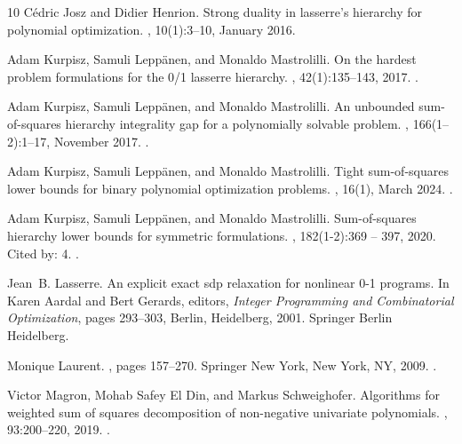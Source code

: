 \documentclass[11pt]{article}
\newcommand{\1}{\textbf{1}}
\begin{document}
\begin{thebibliography}{10}
C{\'e}dric Josz and Didier Henrion.
\newblock Strong duality in lasserre's hierarchy for polynomial optimization.
, 10(1):3--10, January 2016.

Adam Kurpisz, Samuli Lepp{\"{a}}nen, and Monaldo Mastrolilli.
\newblock On the hardest problem formulations for the 0/1 lasserre hierarchy.
, 42(1):135--143, 2017.
\newblock \href {https://doi.org/10.1287/MOOR.2016.0797} {}.

Adam Kurpisz, Samuli Lepp\"{a}nen, and Monaldo Mastrolilli.
\newblock An unbounded sum-of-squares hierarchy integrality gap for a polynomially solvable problem.
, 166(1–2):1–17, November 2017.
\newblock \href {https://doi.org/10.1007/s10107-016-1102-7} {}.

Adam Kurpisz, Samuli Lepp\"{a}nen, and Monaldo Mastrolilli.
\newblock Tight sum-of-squares lower bounds for binary polynomial optimization problems.
, 16(1), March 2024.
\newblock \href {https://doi.org/10.1145/3626106} {}.

Adam Kurpisz, Samuli Leppänen, and Monaldo Mastrolilli.
\newblock Sum-of-squares hierarchy lower bounds for symmetric formulations.
, 182(1-2):369 – 397, 2020.
\newblock Cited by: 4.
\newblock \href {https://doi.org/10.1007/s10107-019-01398-9} {}.

Jean~B. Lasserre.
\newblock An explicit exact sdp relaxation for nonlinear 0-1 programs.
\newblock In Karen Aardal and Bert Gerards, editors, {\em Integer Programming and Combinatorial Optimization}, pages 293--303, Berlin, Heidelberg, 2001. Springer Berlin Heidelberg.

Monique Laurent.
, pages 157--270.
\newblock Springer New York, New York, NY, 2009.
\newblock \href {https://doi.org/10.1007/978-0-387-09686-5_7} {}.

Victor Magron, Mohab {Safey El Din}, and Markus Schweighofer.
\newblock Algorithms for weighted sum of squares decomposition of non-negative univariate polynomials.
, 93:200--220, 2019.
\newblock \href {https://doi.org/10.1016/j.jsc.2018.06.005} {}.


\end{thebibliography}
\end{document}
